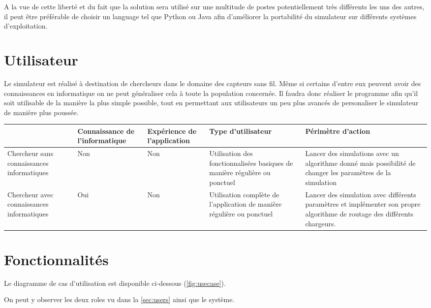 \documentclass[noposter]{polytech}
\begin{document}
		A la vue de cette liberté et du fait que la solution sera utilisé sur une multitude de postes potentiellement très différents les uns des autres, il peut être préférable de choisir un language tel que Python ou Java afin d'améliorer la portabilité du simulateur sur différents systèmes d'exploitation.
	
	\section{Utilisateur\label{sec:users}}
		Le simulateur est réalisé à destination de chercheurs dans le domaine des capteurs sans fil.
		Même si certains d'entre eux peuvent avoir des connaissances en informatique on ne peut généraliser cela à toute la population concernée.
		Il faudra donc réaliser le programme afin qu'il soit utilisable de la manière la plus simple possible, tout en permettant aux utilisateurs un peu plus avancés de personaliser le simulateur de manière plus poussée.
		
		\begin{center}
			\centering
			\begin{tabularx}{\textwidth}{|X|X|X|X|X|}
				\hline
				& Connaissance de l'informatique & Expérience de l'application & Type d'utilisateur & Périmètre d'action\\\hline
				Chercheur sans connaissances informatiques & Non & Non & Utilisation des fonctionnalisées basiques de manière régulière ou ponctuel & Lancer des simulations avec un algorithme donné mais possibilité de changer les paramètres de la simulation\\\hline
				Chercheur avec connaissances informatiques & Oui & Non & Utilisation complète de l'application de manière régulière ou ponctuel & Lancer des simulation avec différents paramètres et implémenter son propre algorithme de routage des différents chargeurs.\\\hline
			\end{tabularx}
		\end{center}

	
	\section{Fonctionnalités}
		Le diagramme de cas d'utilisation est disponible ci-dessous (\autoref{fig:usecase}).
		
		On peut y observer les deux roles vu dans la \autoref{sec:users} ainsi que le système.
		
\end{document}
